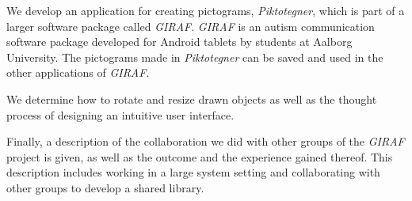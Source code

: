 We develop an application for creating pictograms, \textit{Piktotegner}, which is part of a larger software package called \textit{GIRAF}.
\textit{GIRAF} is an autism communication software package developed for Android tablets by students at Aalborg University.
The pictograms made in \textit{Piktotegner} can be saved and used in the other applications of \textit{GIRAF}.

We determine how to rotate and resize drawn objects as well as the thought process of designing an intuitive user interface.

Finally, a description of the collaboration we did with other groups of the \textit{GIRAF} project is given, as well as the outcome and the experience gained thereof.
This description includes working in a large system setting and collaborating with other groups to develop a shared library.